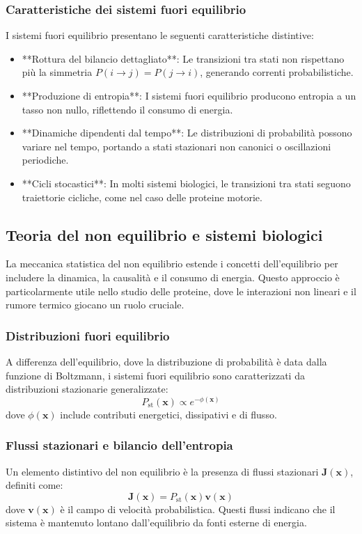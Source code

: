 \documentclass[Lau,binding=0.6cm,oneside,noexaminfo]{sapthesis}
\begin{document}
\subsubsection{Caratteristiche dei sistemi fuori equilibrio}
I sistemi fuori equilibrio presentano le seguenti caratteristiche distintive:
\begin{itemize}
    \item **Rottura del bilancio dettagliato**: Le transizioni tra stati non rispettano più la simmetria \( P(i \to j) = P(j \to i) \), generando correnti probabilistiche.
    \item **Produzione di entropia**: I sistemi fuori equilibrio producono entropia a un tasso non nullo, riflettendo il consumo di energia.
    \item **Dinamiche dipendenti dal tempo**: Le distribuzioni di probabilità possono variare nel tempo, portando a stati stazionari non canonici o oscillazioni periodiche.
    \item **Cicli stocastici**: In molti sistemi biologici, le transizioni tra stati seguono traiettorie cicliche, come nel caso delle proteine motorie.
\end{itemize}

\subsection{Teoria del non equilibrio e sistemi biologici}
La meccanica statistica del non equilibrio estende i concetti dell'equilibrio per includere la dinamica, la causalità e il consumo di energia. Questo approccio è particolarmente utile nello studio delle proteine, dove le interazioni non lineari e il rumore termico giocano un ruolo cruciale.

\subsubsection{Distribuzioni fuori equilibrio}
A differenza dell'equilibrio, dove la distribuzione di probabilità è data dalla funzione di Boltzmann, i sistemi fuori equilibrio sono caratterizzati da distribuzioni stazionarie generalizzate:
\[
P_\text{st}(\mathbf{x}) \propto e^{-\phi(\mathbf{x})}
\]
dove \( \phi(\mathbf{x}) \) include contributi energetici, dissipativi e di flusso.

\subsubsection{Flussi stazionari e bilancio dell'entropia}
Un elemento distintivo del non equilibrio è la presenza di flussi stazionari \( \mathbf{J}(\mathbf{x}) \), definiti come:
\[
\mathbf{J}(\mathbf{x}) = P_\text{st}(\mathbf{x}) \mathbf{v}(\mathbf{x})
\]
dove \( \mathbf{v}(\mathbf{x}) \) è il campo di velocità probabilistica. Questi flussi indicano che il sistema è mantenuto lontano dall'equilibrio da fonti esterne di energia.
\end{document}
